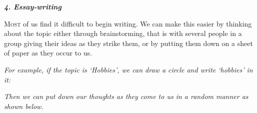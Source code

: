 \documentclass[11pt,a4paper]{article}
\begin{document}
\begin{center}
    {\Huge \bfseries \itshape \color{magenta} 4. Essay-writing}
\end{center}

\vspace{1.5em}

\noindent \textsc{Most} of us find it difficult to begin writing. We can make this easier by thinking about the topic either through brainstorming, that is with several people in a group giving their ideas as they strike them, or by putting them down on a sheet of paper as they occur to us.

\vspace{0.5em}
\noindent \textit{For example, if the topic is `Hobbies', we can draw a circle and write `hobbies' in it:}

\vspace{1.5em}

\begin{center}
\end{center}

\vspace{1.5em}

\noindent \textit{Then we can put down our thoughts as they come to us in a random manner as shown below.}
\end{document}
